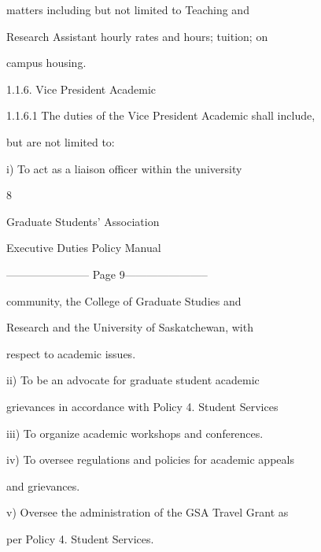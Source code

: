                   matters   including   but   not   limited   to   Teaching   and  

                  Research  Assistant  hourly  rates  and  hours;  tuition;  on  

                  campus housing.  

1.1.6. Vice President Academic  

1.1.6.1           The duties of the Vice President Academic shall include,  

         but are not limited to:   

  

         i)       To     act    as   a    liaison     officer     within      the    university  



                                                 8  

                                     

                                   Graduate Students’ Association  

                                  Executive Duties Policy Manual  

  


----------------------- Page 9-----------------------

                  community,           the    College        of    Graduate        Studies       and  

                  Research   and   the   University   of   Saskatchewan,   with  

                  respect to academic issues.   

  

         ii)      To     be    an     advocate       for    graduate       student      academic  

                  grievances in accordance with Policy 4. Student Services   

  

         iii)     To organize academic workshops and conferences.   

  

  

         iv)      To oversee regulations and policies for academic appeals  

                  and grievances.   

         v)       Oversee  the  administration  of  the  GSA  Travel  Grant  as  

                  per Policy 4. Student Services.  

